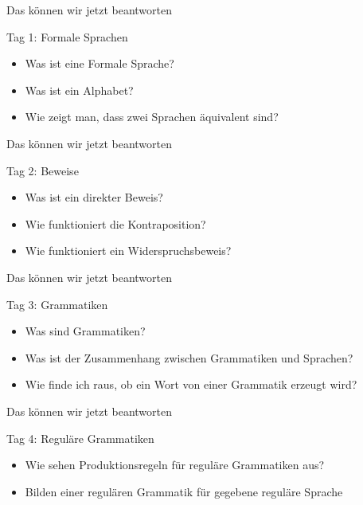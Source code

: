 \begin{frame}[fragile]{Das können wir jetzt beantworten}
  \begin{alertblock}{Tag 1: Formale Sprachen}
    \begin{itemize}
      \item Was ist eine Formale Sprache?
      \item Was ist ein Alphabet?
      \item Wie zeigt man, dass zwei Sprachen äquivalent sind?
    \end{itemize}
  \end{alertblock}
\end{frame}



\begin{frame}[fragile]{Das können wir jetzt beantworten}
  \begin{alertblock}{Tag 2: Beweise}
    \begin{itemize}
      \item Was ist ein direkter Beweis?
      \item Wie funktioniert die Kontraposition?
      \item Wie funktioniert ein Widerspruchsbeweis?
    \end{itemize}
  \end{alertblock}
\end{frame}

\begin{frame}[fragile]{Das können wir jetzt beantworten}
  \begin{alertblock}{Tag 3: Grammatiken}
    \begin{itemize}
      \item Was sind Grammatiken?
      \item Was ist der Zusammenhang zwischen Grammatiken und Sprachen?
      \item Wie finde ich raus, ob ein Wort von einer Grammatik erzeugt wird?
    \end{itemize}
  \end{alertblock}
\end{frame}

\begin{frame}[fragile]{Das können wir jetzt beantworten}
  \begin{alertblock}{Tag 4: Reguläre Grammatiken}
    \begin{itemize}
      \item Wie sehen Produktionsregeln für reguläre Grammatiken aus?
      \item Bilden einer regulären Grammatik für gegebene reguläre Sprache
    \end{itemize}
  \end{alertblock}
\end{frame}

